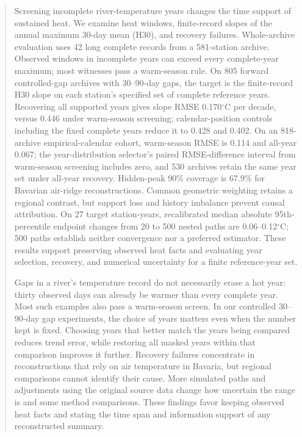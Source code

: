 \documentclass[draft,linenumbers]{agujournal2025}
\begin{document}
\begin{abstract}
Screening incomplete river-temperature years changes the time support of sustained heat. We examine heat windows, finite-record slopes of the annual maximum 30-day mean (H30), and recovery failures. Whole-archive evaluation uses 42 long complete records from a 581-station archive. Observed windows in incomplete years can exceed every complete-year maximum; most witnesses pass a warm-season rule. On 805 forward controlled-gap archives with 30--90-day gaps, the target is the finite-record H30 slope on each station's specified set of complete reference years. Recovering all supported years gives slope RMSE 0.170$^{\circ}$C per decade, versus 0.446 under warm-season screening; calendar-position controls including the fixed complete years reduce it to 0.428 and 0.402. On an 818-archive empirical-calendar cohort, warm-season RMSE is 0.114 and all-year 0.067; the year-distribution selector's paired RMSE-difference interval from warm-season screening includes zero, and 530 archives retain the same year set under all-year recovery. Hidden-peak 90\% coverage is 67.9\% for Bavarian air-ridge reconstructions. Common geometric weighting retains a regional contrast, but support loss and history imbalance prevent causal attribution. On 27 target station-years, recalibrated median absolute 95th-percentile endpoint changes from 20 to 500 nested paths are 0.06--0.12$^{\circ}$C; 500 paths establish neither convergence nor a preferred estimator. These results support preserving observed heat facts and evaluating year selection, recovery, and numerical uncertainty for a finite reference-year set.
\begin{plainlanguagesummary}
Gaps in a river's temperature record do not necessarily erase a hot year: thirty observed days can already be warmer than every complete year. Most such examples also pass a warm-season screen. In our controlled 30--90-day gap experiments, the choice of years matters even when the number kept is fixed. Choosing years that better match the years being compared reduces trend error, while restoring all masked years within that comparison improves it further. Recovery failures concentrate in reconstructions that rely on air temperature in Bavaria, but regional comparisons cannot identify their cause. More simulated paths and adjustments using the original source data change how uncertain the range is and some method comparisons. These findings favor keeping observed heat facts and stating the time span and information support of any reconstructed summary.
\end{plainlanguagesummary}
\end{abstract}
\end{document}
